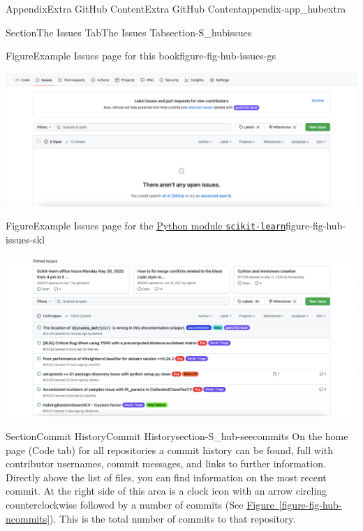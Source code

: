 \documentclass[oneside,10pt,]{book}
\newcommand{\xreffont}{\relax}
\newcommand{\mono}[1]{\texttt{#1}}
\begin{document}
\begin{appendixptx}{Appendix}{Extra GitHub Content}{}{Extra GitHub Content}{}{}{appendix-app_hubextra}
\begin{sectionptx}{Section}{The Issues Tab}{}{The Issues Tab}{}{}{section-S_hubissues}
\begin{figureptx}{Figure}{Example Issues page for this book}{figure-fig-hub-issues-gs}{}%
\begin{image}{0.05}{0.9}{0.05}{}%
\includegraphics[width=\linewidth]{external/hub_issues_gs.pdf}
\end{image}%
\tcblower
\end{figureptx}%
\begin{figureptx}{Figure}{Example Issues page for the \href{https://github.com/scikit-learn/scikit-learn/issues}{Python module \mono{scikit-learn}}\protect\footnotemark{}}{figure-fig-hub-issues-skl}{}%
\begin{image}{0.05}{0.9}{0.05}{}%
\includegraphics[width=\linewidth]{external/hub_issues_skl.pdf}
\end{image}%
\tcblower
\end{figureptx}%
%
\end{sectionptx}
%
%
\typeout{************************************************}
\typeout{************************************************}
%
\begin{sectionptx}{Section}{Commit History}{}{Commit History}{}{}{section-S_hub-seecommits}
%
%
On the home page (Code tab) for all repositories a commit history can be found, full with contributor usernames, commit messages, and links to further information. Directly above the list of files, you can find information on the most recent commit. At the right side of this area is a clock icon with an arrow circling counterclockwise followed by a number of commits (See \hyperref[figure-fig-hub-ncommits]{Figure~{\xreffont\ref{figure-fig-hub-ncommits}}}). This is the total number of commits to that repository.%

\end{sectionptx}
\end{appendixptx}
\end{document}
